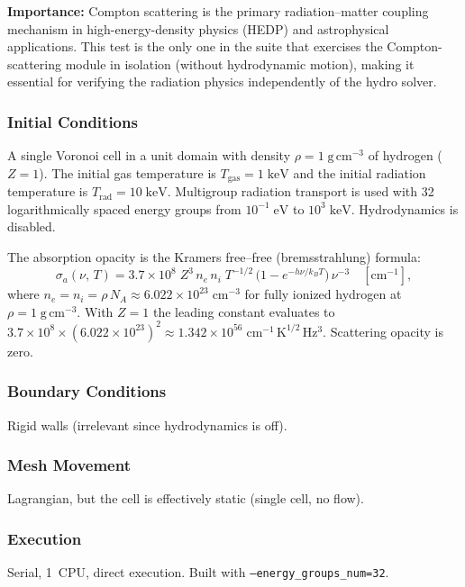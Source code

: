\documentclass[11pt,a4paper]{article}
\begin{document}
\textbf{Importance:} Compton scattering is the primary radiation--matter coupling mechanism in high-energy-density physics (HEDP) and astrophysical applications. This test is the only one in the suite that exercises the Compton-scattering module in isolation (without hydrodynamic motion), making it essential for verifying the radiation physics independently of the hydro solver.

\subsubsection*{Initial Conditions}
A single Voronoi cell in a unit domain with density $\rho = 1\;\mathrm{g\,cm^{-3}}$ of hydrogen ($Z=1$). The initial gas temperature is $T_{\mathrm{gas}} = 1\;\mathrm{keV}$ and the initial radiation temperature is $T_{\mathrm{rad}} = 10\;\mathrm{keV}$. Multigroup radiation transport is used with 32 logarithmically spaced energy groups from $10^{-1}\;\mathrm{eV}$ to $10^{3}\;\mathrm{keV}$. Hydrodynamics is disabled.

The absorption opacity is the Kramers free--free (bremsstrahlung) formula:
\[
  \sigma_a(\nu,\,T) = 3.7\times10^{8}\;Z^{3}\,n_e\,n_i\;T^{-1/2}\,\bigl(1 - e^{-h\nu/k_BT}\bigr)\,\nu^{-3}\quad[\mathrm{cm^{-1}}],
\]
where $n_e = n_i = \rho\,N_A \approx 6.022\times10^{23}\;\mathrm{cm^{-3}}$ for fully ionized hydrogen at $\rho = 1\;\mathrm{g\,cm^{-3}}$. With $Z=1$ the leading constant evaluates to $3.7\times10^{8}\times(6.022\times10^{23})^{2} \approx 1.342\times10^{56}\;\mathrm{cm^{-1}\,K^{1/2}\,Hz^{3}}$. Scattering opacity is zero.

\subsubsection*{Boundary Conditions}
Rigid walls (irrelevant since hydrodynamics is off).

\subsubsection*{Mesh Movement}
Lagrangian, but the cell is effectively static (single cell, no flow).

\subsubsection*{Execution}
Serial, 1~CPU, direct execution. Built with \texttt{--energy\_groups\_num=32}.
\end{document}
